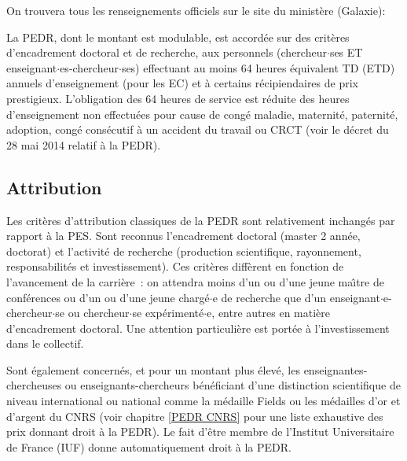 On trouvera tous les renseignements officiels sur le site du minist\`ere (Galaxie):



La PEDR, dont le montant est modulable, est accord\'ee sur des crit\`eres d'encadrement
doctoral et de recherche,  aux personnels (chercheur$\cdot$ses ET enseignant$\cdot$es-chercheur$\cdot$ses)
effectuant au moins 64 heures \'equivalent TD (ETD) annuels d'enseignement (pour les EC)
et \`a certains r\'ecipiendaires de prix prestigieux. L'obligation des 64 heures de service est r\'eduite des heures d'enseignement non effectu\'ees pour cause de cong\'e maladie, maternit\'e, paternit\'e, adoption, cong\'e cons\'ecutif \`a un accident du travail ou CRCT (voir le d\'ecret du 28 mai 2014 relatif \`a la PEDR).


\subsection{Attribution}

Les crit\`eres d'attribution classiques de la PEDR sont relativement inchang\'es par rapport \`a la PES.
Sont reconnus l'encadrement doctoral (master 2\ieme{} ann\'ee,
doctorat) et l'activit\'e de recherche (production scientifique, rayonnement, responsabilit\'es et investissement).
Ces crit\`eres diff\`erent en
fonction de l'avancement de la carri\`ere~: on attendra moins d'un ou d'une
jeune ma\^\i  tre de conf\'erences ou d'un ou d'une jeune charg\'e$\cdot$e de recherche que d'un enseignant$\cdot$e-chercheur$\cdot$se ou chercheur$\cdot$se
exp\'eriment\'e$\cdot$e, entre autres en mati\`ere d'encadrement
doctoral. Une attention particuli\`ere est port\'ee \`a l'investissement dans le collectif.

Sont \'egalement concern\'es, et pour un montant plus \'elev\'e, les enseignantes-chercheuses ou enseignants-chercheurs
b\'en\'eficiant d'une distinction scientifique de niveau international ou national comme la m\'edaille Fields ou
les m\'edailles d'or et d'argent du CNRS
(voir chapitre \ref{PEDR CNRS} pour une liste exhaustive des prix donnant droit \`a la PEDR). Le fait d'\^etre membre de l'Institut Universitaire de France (IUF) donne automatiquement droit \`a la PEDR.


